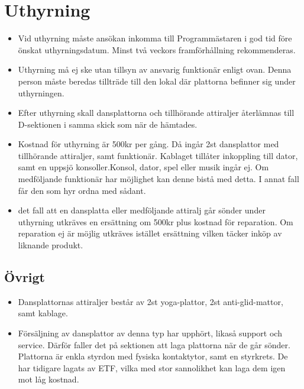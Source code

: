 \documentclass{dsekprotokoll}
\begin{document}
\section{Uthyrning}
\begin{itemize}
    \item Vid uthyrning måste ansökan inkomma till Programmästaren i god tid före önskat uthyrningsdatum. Minst två veckors framförhållning rekommenderas.
    \item Uthyrning må ej ske utan tillsyn av ansvarig funktionär enligt ovan. Denna person måste beredas tillträde till den lokal där plattorna befinner sig under uthyrningen.
    \item Efter uthyrning skall dansplattorna och tillhörande attiraljer återlämnas till D-sektionen i samma skick som när de hämtades.
    \item Kostnad för uthyrning är 500kr per gång. Då ingår 2st dansplattor med tillhörande attiraljer, samt funktionär. Kablaget tillåter inkoppling till dator, samt en uppsjö konsoller.Konsol, dator, spel eller musik ingår ej. Om medföljande funktionär har möjlighet kan denne bistå med detta. I annat fall får den som hyr ordna med sådant.
    \item det fall att en dansplatta eller medföljande attiralj går sönder under uthyrning utkräves en ersättning om 500kr plus kostnad för reparation. Om reparation ej är möjlig utkräves istället ersättning vilken täcker inköp av liknande produkt.
\end{itemize}


\subsection{Övrigt}
\begin{itemize}
    \item Dansplattornas attiraljer består av 2st yoga-plattor, 2st anti-glid-mattor, samt kablage.
    \item Försäljning av dansplattor av denna typ har upphört, likaså support och service. Därför faller det på sektionen att laga plattorna när de går sönder. Plattorna är enkla styrdon med fysiska kontaktytor, samt en styrkrets. De har tidigare lagats av ETF, vilka med stor sannolikhet kan laga dem igen mot låg kostnad.
\end{itemize}
\end{document}
